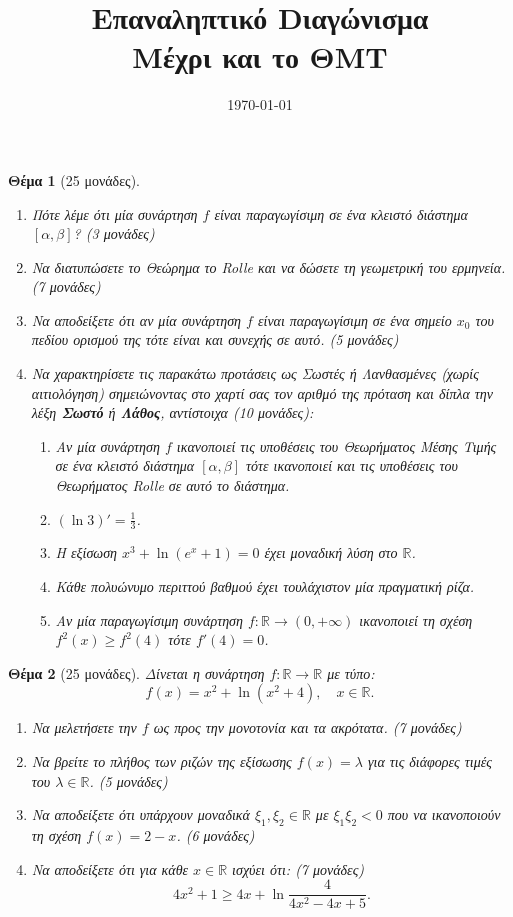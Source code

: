 \documentclass[11pt,a4paper]{article}
\title{{\Huge\bfseries Επαναληπτικό Dιαγώνισμα}\\[1ex]\Large Μέχρι και το ΘΜΤ}
\author{\href{https://aftermaths.gr}{\en{aftermaths.gr}}}
\date{\today}
\newcommand{\R}{{\mathbb{R}}}
\newcommand{\en}[1]{\foreignlanguage{english}{#1}}
\theoremstyle{myStyle}
\newtheorem{them}{Θέμα}
\begin{document}
	\maketitle
	\begin{them}[25 μονάδες]
		\begin{enumerate}
			\item Πότε λέμε ότι μία συνάρτηση $f$ είναι παραγωγίσιμη σε ένα κλειστό διάστημα $[\alpha,\beta]$? (3 μονάδες)
			\item Να διατυπώσετε το Θεώρημα το \en{Rolle} και να δώσετε τη γεωμετρική του ερμηνεία. (7 μονάδες)
			\item Να αποδείξετε ότι αν μία συνάρτηση $f$ είναι παραγωγίσιμη σε ένα σημείο $x_0$ του πεδίου ορισμού της τότε είναι και συνεχής σε αυτό. (5 μονάδες)
			\item Να χαρακτηρίσετε τις παρακάτω προτάσεις ως \textit{Σωστές} ή \textit{Λανθασμένες} (χωρίς αιτιολόγηση) σημειώνοντας στο 
			χαρτί σας τον αριθμό της πρόταση και δίπλα την λέξη \textbf{Σωστό} ή \textbf{Λάθος}, αντίστοιχα (10 μονάδες):
			\begin{enumerate}
				\item Αν μία συνάρτηση $f$ ικανοποιεί τις υποθέσεις του Θεωρήματος Μέσης Τιμής σε ένα κλειστό διάστημα $[\alpha,\beta]$ τότε ικανοποιεί και τις υποθέσεις του Θεωρήματος \en{Rolle} σε αυτό το διάστημα.
				\item $(\ln3)'=\frac{1}{3}$.
				\item Η εξίσωση $x^3+\ln(e^x+1)=0$ έχει μοναδική λύση στο $\R$.
				\item Κάθε πολυώνυμο περιττού βαθμού έχει τουλάχιστον μία πραγματική ρίζα.
				\item Αν μία παραγωγίσιμη συνάρτηση $f:\R\to(0,+\infty)$ ικανοποιεί τη σχέση $f^2(x)\geq f^2(4)$ τότε $f'(4)=0$.
			\end{enumerate}
		\end{enumerate}
	\end{them}

	\begin{them}[25 μονάδες]
		Δίνεται η συνάρτηση $f:\R\to\R$ με τύπο:
		\[f(x)=x^2+\ln(x^2+4),\quad x\in\R.\]
		\begin{enumerate}
			\item Να μελετήσετε την $f$ ως προς την μονοτονία και τα ακρότατα. (7 μονάδες)
			\item Να βρείτε το πλήθος των ριζών της εξίσωσης $f(x)=\lambda$ για τις διάφορες τιμές του $\lambda\in\R$. (5 μονάδες)
			\item Να αποδείξετε ότι υπάρχουν μοναδικά $\xi_1,\xi_2\in\R$ με $\xi_1\xi_2<0$ που να ικανοποιούν τη σχέση $f(x)=2-x$. (6 μονάδες)
			\item Να αποδείξετε ότι για κάθε $x\in\R$ ισχύει ότι: (7 μονάδες)
			\[4x^2+1\geq4x+\ln\frac{4}{4x^2-4x+5}.\]
		\end{enumerate}
	\end{them}
	
\end{document}
